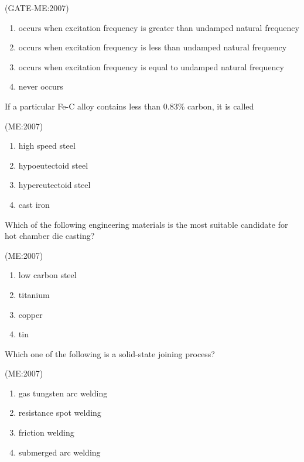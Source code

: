 	\hfill{(GATE-ME:2007)}

\begin{enumerate}
    \item occurs when excitation frequency is greater than undamped natural frequency
    \item occurs when excitation frequency is less than undamped natural frequency
    \item occurs when excitation frequency is equal to undamped natural frequency
    \item never occurs
\end{enumerate}

\item If a particular Fe-C alloy contains less than 0.83\% carbon, it is called

	\hfill{(ME:2007)}
	\begin{multicols}{2}
\begin{enumerate}
    \item high speed steel
    \item hypoeutectoid steel
    \item hypereutectoid steel
    \item cast iron
\end{enumerate}
\end{multicols}

\item Which of the following engineering materials is the most suitable candidate for hot chamber die casting? 

	\hfill{(ME:2007)}
	\begin{multicols}{2}
\begin{enumerate}
    \item low carbon steel
    \item titanium
    \item copper
    \item tin
\end{enumerate}
\end{multicols}

\item Which one of the following is a solid-state joining process?

	\hfill{(ME:2007)}
	\begin{multicols}{2}
\begin{enumerate}
    \item gas tungsten arc welding
    \item resistance spot welding
    \item friction welding
    \item submerged arc welding
\end{enumerate}
\end{multicols}

  	
